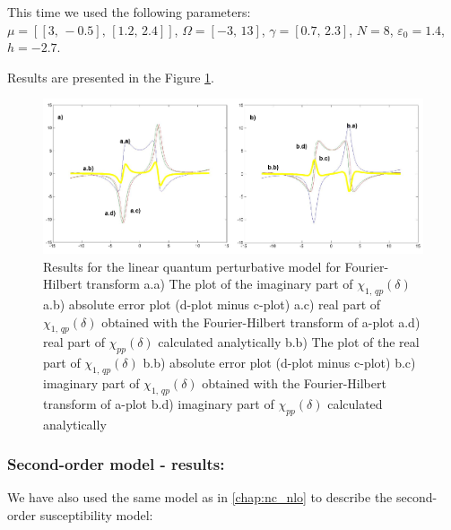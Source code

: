 \documentclass[12pt,twoside,a4paper]{article}
\numberwithin{equation}{subsection}
\numberwithin{figure}{subsection}
\begin{document}
This time we used the following parameters: \\
$\mu = [[3, \, - 0.5], \,[1.2, \,2.4]]$, 
$\Omega =[ - 3, \,13]$, 
$\gamma =[0.7, \,2.3]$,  
$N=8$, 
${\varepsilon_{0}}=1.4$, 
$h= - 2.7$.

Results are presented in the Figure \ref{fig:four_qp1}. 

\begin{figure}
  \includegraphics[width=150mm]{img/four_qp1.png}
  \caption{Results for the linear quantum perturbative model for Fourier-Hilbert transform
    a.a) The plot of the imaginary part of ${\chi_{1, \,qp}}(\delta )$
    a.b) absolute error plot (d-plot minus c-plot) 
    a.c) real part of ${\chi_{1, \,qp}}(\delta )$ obtained with the Fourier-Hilbert transform of a-plot 
    a.d) real part of ${\chi_{pp}}(\delta )$ calculated analytically 
    b.b) The plot of the real part of ${\chi_{1, \,qp}}(\delta )$ 
    b.b) absolute error plot (d-plot minus c-plot) 
    b.c) imaginary part of ${\chi_{1, \,qp}}(\delta )$ obtained with the Fourier-Hilbert transform of a-plot 
    b.d) imaginary part of ${\chi_{pp}}(\delta )$ calculated analytically  
    \label{fig:four_qp1}
  }
\end{figure}

\subsubsection*{Second-order model - results:}

We have also used the same model as in \ref{chap:nc_nlo} to describe the second-order susceptibility model:
\end{document}
